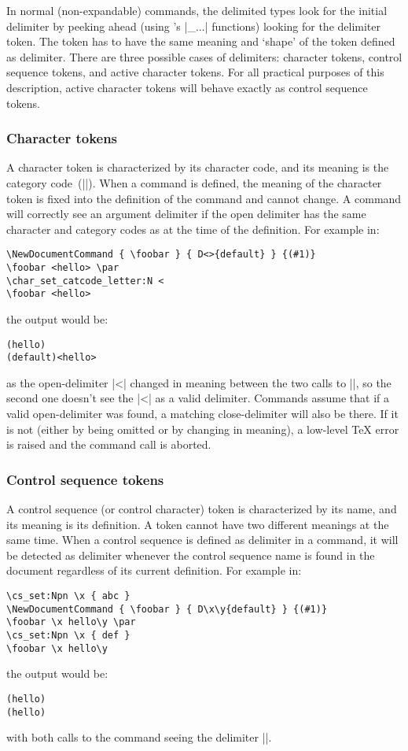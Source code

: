 \documentclass{ltxguide}
\begin{document}
In normal (non-expandable) commands, the delimited types look for the
initial delimiter by peeking ahead (using 's |\peek_...|
functions) looking for the delimiter token.  The token has to have the
same meaning and `shape' of the token defined as delimiter.
There are three possible cases of delimiters: character tokens, control
sequence tokens, and active character tokens.  For all practical purposes
of this description, active character tokens will behave exactly as
control sequence tokens.

\subsubsection{Character tokens}

A character token is characterized by its character code, and its meaning
is the category code~(|\catcode|).  When a command is defined, the meaning
of the character token is fixed into the definition of the command and
cannot change.  A command will correctly see an argument delimiter if
the open delimiter has the same character and category codes as at the
time of the definition.  For example in:
\begin{verbatim}
\NewDocumentCommand { \foobar } { D<>{default} } {(#1)}
\foobar <hello> \par
\char_set_catcode_letter:N <
\foobar <hello>
\end{verbatim}
the output would be:
\begin{verbatim}
(hello)
(default)<hello>
\end{verbatim}
as the open-delimiter |<| changed in meaning between the two calls to
|\foobar|, so the second one doesn't see the |<| as a valid delimiter.
Commands assume that if a valid open-delimiter was found, a matching
close-delimiter will also be there.  If it is not (either by being
omitted or by changing in meaning), a low-level \TeX{} error is raised
and the command call is aborted.

\subsubsection{Control sequence tokens}

A control sequence (or control character) token is characterized by
its name, and its meaning is its definition.
A token cannot have two different meanings at the same time.
When a control sequence is defined as delimiter in a command,
it will be detected as delimiter whenever the control sequence name
is found in the document regardless of its current definition.
For example in:
\begin{verbatim}
\cs_set:Npn \x { abc }
\NewDocumentCommand { \foobar } { D\x\y{default} } {(#1)}
\foobar \x hello\y \par
\cs_set:Npn \x { def }
\foobar \x hello\y
\end{verbatim}
the output would be:
\begin{verbatim}
(hello)
(hello)
\end{verbatim}
with both calls to the command seeing the delimiter |\x|.
\end{document}
